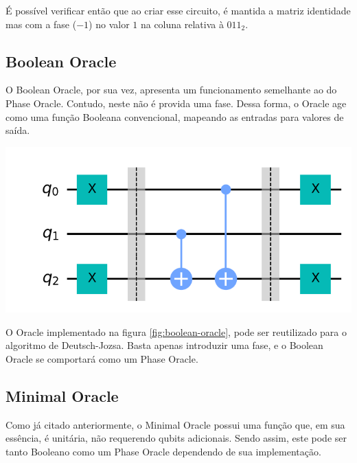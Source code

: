 \documentclass{article}
\begin{document}
É possível verificar então que ao criar esse circuito, é mantida a matriz identidade mas com a fase ($-1$) no valor $1$ na coluna relativa à $011_{2}$. 


\subsection{Boolean Oracle}

O Boolean Oracle, por sua vez, apresenta um funcionamento semelhante ao do Phase Oracle. Contudo, neste não é provida uma fase. Dessa forma, o Oracle age como uma função Booleana convencional, mapeando as entradas para valores de saída.

\begin{center}
	\includegraphics[scale=0.3]{balanced-oracle.png}
	\label{fig:boolean-oracle}
\end{center}

O Oracle implementado na figura \ref{fig:boolean-oracle}, pode ser reutilizado para o algoritmo de Deutsch-Jozsa. Basta apenas introduzir uma fase, e o Boolean Oracle se comportará como um Phase Oracle.

\subsection{Minimal Oracle}

Como já citado anteriormente, o Minimal Oracle possui uma função que, em sua essência, é unitária, não requerendo qubits adicionais. Sendo assim, este pode ser tanto Booleano como um Phase Oracle dependendo de sua implementação.
\end{document}
